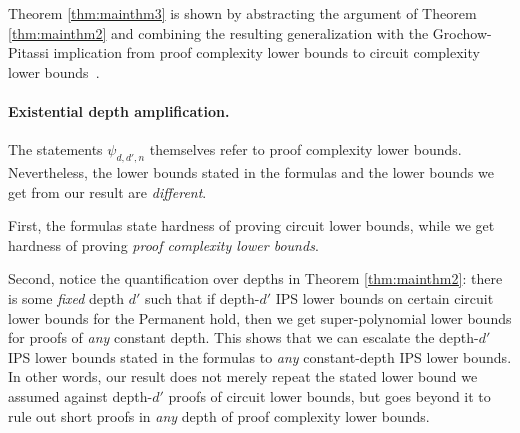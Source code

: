 \documentclass[11pt,letter]{article}
\newcommand{\para}{\paragraph}
\theoremstyle{remark} %
\begin{document}
{Theorem \ref{thm:mainthm3} is shown by abstracting the argument of Theorem \ref{thm:mainthm2} and combining the resulting generalization with the Grochow-Pitassi implication from proof complexity lower bounds to circuit complexity lower bounds~\cite{GP18}.

\para{Existential depth amplification.}
The statements $\psi_{d,d',n}$ themselves refer to proof complexity lower bounds. Nevertheless, the lower bounds stated in the formulas and the lower bounds we get from our result are \emph{different}.

First, the formulas state hardness of proving circuit lower bounds, while we get hardness of proving \emph{proof complexity lower bounds}. 

Second, notice the quantification over depths in Theorem \ref{thm:mainthm2}: there is some {\it fixed} depth $d'$ such that if depth-$d'$ IPS lower bounds on certain circuit lower bounds for the Permanent hold, then we get super-polynomial lower bounds for proofs of {\it any} constant depth. This shows that we can escalate the depth-$d'$ IPS lower bounds stated in the formulas to \emph{any} constant-depth IPS lower bounds. In other words, our result does not merely repeat the stated lower bound we assumed against depth-$d'$ proofs of circuit lower bounds, but goes beyond it to rule out short proofs in \emph{any} depth of proof complexity lower bounds.  





}
\end{document}
